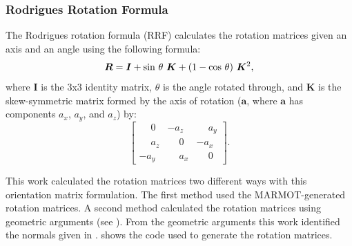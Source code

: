 \documentclass[twoside,senior]{BYUPhys}
\begin{document}
\subsubsection{Rodrigues Rotation Formula\label{PQ:RRF}}
The Rodrigues rotation formula\cite{belongie2006} (RRF) calculates the rotation matrices given an axis and an angle using the following formula:
\begin{equation}
\label{eq:rrf}
\bm{R} = \bm{I} + \textnormal{sin}\ \theta\ \bm{K} + (1 - \textnormal{cos}\ \theta)\ \bm{K}^2,
\end{equation}
where $\bm{I}$ is the 3x3 identity matrix, $\theta$ is the angle rotated through, and $\bm{K}$ is the skew-symmetric matrix formed by the axis of rotation ($\bm{a}$, where $\bm{a}$ has components $a_x$, $a_y$, and $a_z$) by:
\begin{equation}
\label{eq:skewSymMat}
\left[
\begin{array}{ccc}
\phantom{-}0 & -a_z & \phantom{-}a_y \\
\phantom{-}a_z & \phantom{-}0 & -a_x \\
-a_y & \phantom{-}a_x & \phantom{-}0
\end{array}
\right].
\end{equation}

This work calculated the rotation matrices two different ways with this orientation matrix formulation.  The first method used the MARMOT-generated rotation matrices.  A second method calculated the rotation matrices using geometric arguments (see ).  From the geometric arguments this work identified the normals given in .   shows the code used to generate the rotation matrices.
\end{document}
